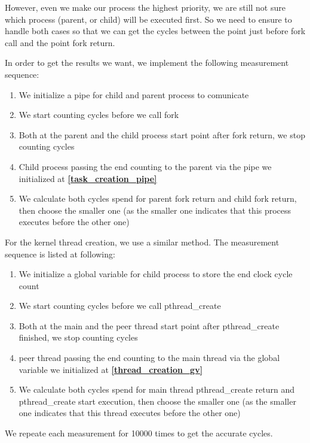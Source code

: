 However, even we make our process the highest priority,  we are still not sure which process (parent, or child) will be executed first. So we need to ensure to handle both cases so that we can get the cycles between the point just before fork call and the point fork return.

In order to get the results we want, we implement the following measurement sequence:

\begin{enumerate}
    \item We initialize a pipe for child and parent process to comunicate \label{task_creation_pipe}
    \item We start counting cycles before we call fork
    \item Both at the parent and the child process start point after fork return, we stop counting cycles
    \item Child process passing the end counting to the parent via the pipe we initialized at \textbf{\ref{task_creation_pipe}}
    \item We calculate both cycles spend for parent fork return and child fork return, then choose the smaller one (as the smaller one indicates that this process executes before the other one)
\end{enumerate}

For the kernel thread creation, we use a similar method. The measurement sequence is listed at following:
\begin{enumerate}
    \item We initialize a global variable for child process to store the end clock cycle count \label{thread_creation_gv}
    \item We start counting cycles before we call pthread\_create
    \item Both at the main and the peer thread start point after pthread\_create finished, we stop counting cycles
    \item peer thread passing the end counting to the main thread via the global variable we initialized at \textbf{\ref{thread_creation_gv}}
    \item We calculate both cycles spend for main thread pthread\_create return and pthread\_create start execution, then choose the smaller one (as the smaller one indicates that this thread executes before the other one)
\end{enumerate}

We repeate each measurement for 10000 times to get the accurate cycles.


